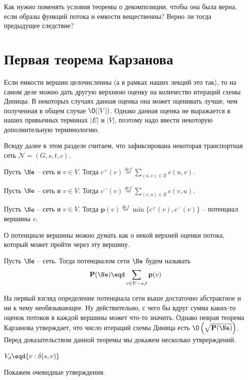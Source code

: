\Exe Как нужно поменять условия теоремы о декомпозиции, чтобы она была верна, если образы функций потока и емкости вещественны? Верно ли тогда предыдущее следствие?

\section{Первая теорема Карзанова}
\begingroup

Если емкости вершин целочисленны (а в рамках наших лекций это так), то на самом деле можно дать другую верхнюю оценку на количество итераций схемы Диницы.
В некоторых случаях данная оценка она может оценивать лучше, чем полученная в общем случае $\O(|V|)$. Однако данная оценка не выражается в наших привычных терминах $|E|$ и $|V|$, поэтому надо ввести некоторую дополнительную терминологию.

Всюду далее в этом разделе считаем, что зафиксирована некоторая транспортная сеть $\mathcal{N} = (G, s, t, c)$.

\newcommand{\p}{\mathbf{p}}

\renewcommand{\P}{\mathbf{P}}

\Def Пусть $\Ne$ -- сеть и $v \in V$. Тогда $c^+(v) \overset{def}{=} \sum\limits_{(u, v) \in E} c(u, v)$.

\Def Пусть $\Ne$ -- сеть и $v \in V$. Тогда $c^-(v) \overset{def}{=} \sum\limits_{(v, u) \in E} c(v, u)$.

\Def Пусть $\Ne$ -- сеть и $v \in V$. Тогда $\p(v) \overset{def}{=} \min\{c^+(v), c^-(v)\}$ -- потенциал вершины $v$.

О потенциале вершины можно думать как о некой верхней оценки потока, который может пройти через эту вершину.

\Def Пусть $\Ne$ -- сеть. Тогда потенциалом сети $\Ne$ будем называть
\begin{equation*}
    \P(\Ne) \eqd \sum\limits_{v \in V - s, t} \p(v)
\end{equation*}

На первый взгляд определение потенциала сети выше достаточно абстрактное и ни к чему необязывающее.
Ну действительно, с чего бы вдруг сумма каких-то оценок потоков в каждой вершины может что-то значить.
Однако певрая теорема Карзанова утверждает, что число итераций схемы Диница есть $\O\left(\sqrt {\P(\Ne)}\right)$. Перед доказательством данной теоремы мы докажем несколько утврерждений.

\Def $V_d \eqd \{ v: \delta(s, v) \}$

Покажем очевидные утверждения.

